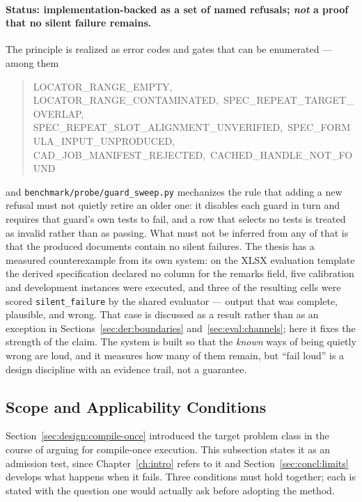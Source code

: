 \paragraph{Status: implementation-backed as a set of named refusals; \emph{not} a proof
that no silent failure remains.}
The principle is realized as error codes and gates that can be enumerated --- among them
\begin{quote}
\ttfamily\raggedright
LOCATOR\_RANGE\_EMPTY, LOCATOR\_RANGE\_CONTAMINATED,\
SPEC\_REPEAT\_TARGET\_OVERLAP, SPEC\_REPEAT\_SLOT\_ALIGNMENT\_UNVERIFIED,\
SPEC\_FORMULA\_INPUT\_UNPRODUCED, CAD\_JOB\_MANIFEST\_REJECTED,\
CACHED\_HANDLE\_NOT\_FOUND
\end{quote}
\noindent and \texttt{benchmark/probe/guard\_sweep.py} mechanizes the rule that adding a new
refusal must not quietly retire an older one: it disables each guard in turn and requires
that guard's own tests to fail, and a row that selects no tests is treated as invalid
rather than as passing. What must not be inferred from any of that is that the produced
documents contain no silent failures. The thesis has a measured counterexample from its own
system: on the XLSX evaluation template the derived specification declared no column for
the remarks field, five calibration and development instances were executed, and three of
the resulting cells were scored \texttt{silent\_failure} by the shared evaluator --- output
that was complete, plausible, and wrong. That case is discussed as a result rather than as
an exception in Sections~\ref{sec:der:boundaries} and~\ref{sec:eval:channels}; here it
fixes the strength of the claim. The system is built so that the \emph{known} ways of
being quietly wrong are loud, and it measures how many of them remain, but ``fail loud''
is a design discipline with an evidence trail, not a guarantee.

\subsection{Scope and Applicability Conditions}
\label{sec:design:scope}

Section~\ref{sec:design:compile-once} introduced the target problem class in the course of
arguing for compile-once execution. This subsection states it as an admission test, since
Chapter~\ref{ch:intro} refers to it and Section~\ref{sec:concl:limits} develops what
happens when it fails. Three conditions must hold together; each is stated with the
question one would actually ask before adopting the method.

